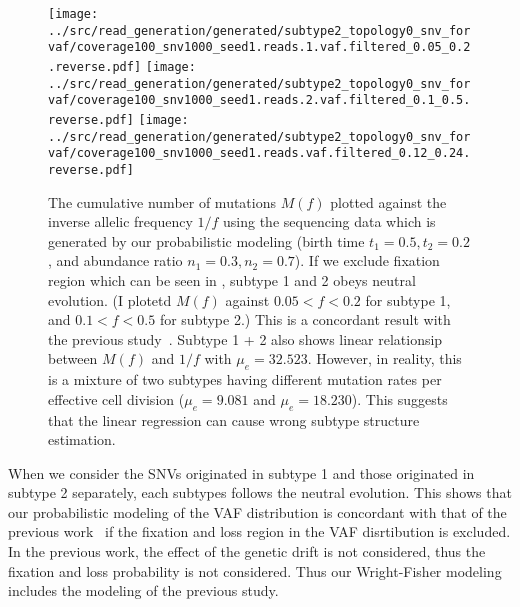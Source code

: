 \documentclass{article}
\begin{document}
\begin{figure}[H]
 \texttt{[image: ../src/read\_generation/generated/subtype2\_topology0\_snv\_forvaf/coverage100\_snv1000\_seed1.reads.1.vaf.filtered\_0.05\_0.2.reverse.pdf]}
 \texttt{[image: ../src/read\_generation/generated/subtype2\_topology0\_snv\_forvaf/coverage100\_snv1000\_seed1.reads.2.vaf.filtered\_0.1\_0.5.reverse.pdf]}
 \texttt{[image: ../src/read\_generation/generated/subtype2\_topology0\_snv\_forvaf/coverage100\_snv1000\_seed1.reads.vaf.filtered\_0.12\_0.24.reverse.pdf]}
 \caption{The cumulative number of mutations $M(f)$ plotted against the inverse allelic frequency $1/f$ using the sequencing data which is generated by our probabilistic modeling (birth time $t_1=0.5, t_2=0.2$, and abundance ratio $n_1=0.3,  n_2=0.7$). If we exclude fixation region which can be seen in , subtype 1 and 2 obeys neutral evolution. (I plotetd $M(f)$ against $0.05 < f < 0.2$ for subtype 1, and $0.1 < f < 0.5$ for subtype 2.) This is a concordant result with the previous study~\cite{williams2016identification}. Subtype 1 + 2 also shows linear relationsip between $M(f)$ and $1/f$ with $\mu_e = 32.523$.  However, in reality, this is a mixture of two subtypes having different mutation rates per effective cell division ($\mu_e = 9.081$ and $\mu_e=18.230$). This suggests that the linear regression can cause wrong subtype structure estimation.}
 \label{inverse_VAF_cumulative_generated}
\end{figure}

When we consider the SNVs originated in subtype 1 and those originated in subtype 2 separately, each subtypes follows the neutral evolution.
This shows that our probabilistic modeling of the VAF distribution is concordant with that of the previous work~\cite{williams2016identification} if the fixation and loss region in the VAF disrtibution is excluded. In the previous work, the effect of the genetic drift is not considered, thus the fixation and loss probability is not considered. Thus our Wright-Fisher modeling includes the modeling of the previous study.
\end{document}
